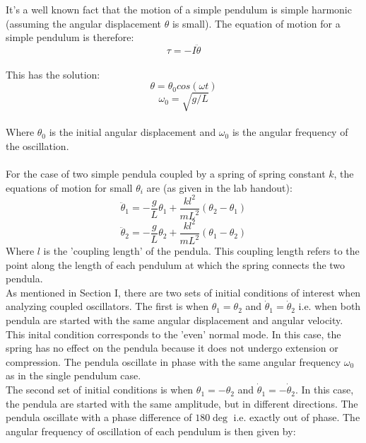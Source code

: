 \documentclass[main.tex]{subfiles}
\begin{document}
It's a well known fact that the motion of a simple pendulum is simple harmonic (assuming the angular displacement $\theta$ is small). The equation of motion for a simple pendulum is therefore: 
\\
\begin{equation}
\tau = -I\ddot\theta
\end{equation}
\\
This has the solution:
\\
\begin{equation}
\theta = \theta_0 cos(\omega t)
\end{equation}
\begin{equation}
\omega_0 = \sqrt{g/L}
\end{equation}
\\
Where $\theta_0$ is the initial angular displacement and $\omega_0$ is the angular frequency of the oscillation.
\\\\
For the case of two simple pendula coupled by a spring of spring constant $k$, the equations of motion for small $\theta_i$ are (as given in the lab handout):
\\
\begin{equation}
\ddot\theta_1 = -\frac{g}{L}\theta_1 + \frac{kl^2}{mL^2}(\theta_2 - \theta_1)
\end{equation}
\begin{equation}
\ddot\theta_2 = -\frac{g}{L}\theta_2 + \frac{kl^2}{mL^2}(\theta_1 - \theta_2)
\end{equation}
Where $l$ is the 'coupling length' of the pendula. This coupling length refers to the point along the length of each pendulum at which the spring connects the two pendula. 
\\
As mentioned in Section I, there are two sets of initial conditions of interest when analyzing coupled oscillators. The first is when $\theta_1 = \theta_2$ and $\dot\theta_1 = \dot\theta_2$ i.e. when both pendula are started with the same angular displacement and angular velocity. This inital condition corresponds to the 'even' normal mode. In this case, the spring has no effect on the pendula because it does not undergo extension or compression. The pendula oscillate in phase with the same angular frequency $\omega_0$ as in the single pendulum case.
\\
The second set of initial conditions is when $\theta_1 = -\theta_2$ and $\dot\theta_1 = -\dot\theta_2$. In this case, the pendula are started with the same amplitude, but in different directions. The pendula oscillate with a phase difference of $180\deg$ i.e. exactly out of phase. The angular frequency of oscillation of each pendulum is then given by:
\end{document}

